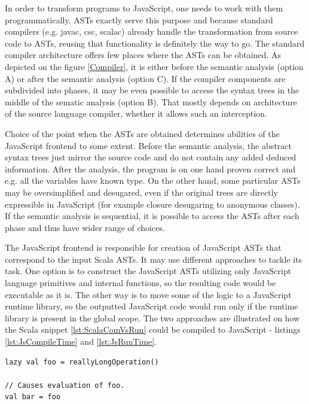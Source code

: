 \documentclass[12pt,a4paper]{report}
\begin{document}
In order to transform programs to JavaScript, one needs to work with them programmatically. ASTs exactly serve this purpose and because standard compilers (e.g. javac, csc, scalac) already handle the transformation from source code to ASTs, reusing that functionality is definitely the way to go. The standard compiler architecture offers few places where the ASTs can be obtained. As depicted on the figure \ref{Compiler}, it is either before the semantic analysis (option A) or after the semantic analysis (option C). If the compiler components are subdivided into phases, it may be even possible to access the syntax trees in the middle of the sematic analysis (option B). That mostly depends on architecture of the source language compiler, whether it allows such an interception.

Choice of the point when the ASTs are obtained determines abilities of the JavaScript frontend to some extent. Before the semantic analysis, the abstract syntax trees just mirror the source code and do not contain any added deduced information. After the analysis, the program is on one hand proven correct and e.g. all the variables have known type. On the other hand, some particular ASTs may be oversimplified and desugared, even if the original trees are directly expressible in JavaScript (for example closure desugaring to anonymous classes). If the semantic analysis is sequential, it is possible to access the ASTs after each phase and thus have wider range of choices.

The JavaScript frontend is responsible for creation of JavaScript ASTs that correspond to the input Scala ASTs. It may use different approaches to tackle its task. One option is to construct the JavaScript ASTs utilizing only JavaScript language primitives and internal functions, so the resulting code would be executable as it is. The other way is to move some of the logic to a JavaScript runtime library, so the outputted JavaScript code would run only if the runtime library is present in the global scope. The two approaches are illustrated on how the Scala snippet \ref{lst:ScalaComVsRun} could be compiled to JavaScript - listings \ref{lst:JsCompileTime} and \ref{lst:JsRunTime}.

\begin{lstlisting}[frame=single,caption={Scala input.},label={lst:ScalaComVsRun}]
lazy val foo = reallyLongOperation()

// Causes evaluation of foo.
val bar = foo 
\end{lstlisting}
\end{document}
